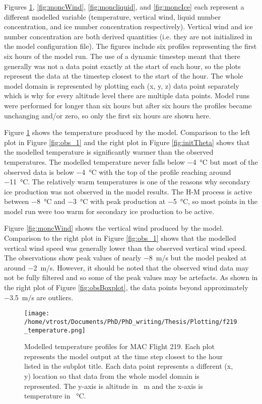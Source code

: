 Figures \ref{fig:moncTemp}, \ref{fig:moncWind}, \ref{fig:moncliquid}, and \ref{fig:moncIce} each represent a different modelled variable (temperature, vertical wind, liquid number concentration, and ice number concentration respectively). Vertical wind and ice number concentration are both derived quantities (i.e. they are not initialized in the model configuration file). The figures include six profiles representing the first six hours of the model run. The use of a dynamic timestep meant that there generally was not a data point exactly at the start of each hour, so the plots represent the data at the timestep closest to the start of the hour. The whole model domain is represented by plotting each (x, y, z) data point separately which is why for every altitude level there are multiple data points. Model runs were performed for longer than six hours but after six hours the profiles became unchanging and/or zero, so only the first six hours are shown here.

Figure \ref{fig:moncTemp} shows the temperature produced by the model. Comparison to the left plot in Figure \ref{fig:obs_1} and the right plot in Figure \ref{fig:initTheta} shows that the modelled temperature is significantly warmer than the observed temperatures. The modelled temperature never falls below \SI{-4}{\degreeCelsius} but most of the observed data is below \SI{-4}{\degreeCelsius} with the top of the profile reaching around \SI{-11}{\degreeCelsius}. The relatively warm temperatures is one of the reasons why secondary ice production was not observed in the model results. The H-M process is active between \SI{-8}{\degreeCelsius} and \SI{-3}{\degreeCelsius} with peak production at \SI{-5}{\degreeCelsius}, so most points in the model run were too warm for secondary ice production to be active.

Figure \ref{fig:moncWind} shows the vertical wind produced by the model. Comparison to the right plot in Figure \ref{fig:obs_1} shows that the modelled vertical wind speed was generally lower than the observed vertical wind speed. The observations show peak values of nearly \SI{-8}{m/s} but the model peaked at around \SI{-2}{m/s}. However, it should be noted that the observed wind data may not be fully filtered and so some of the peak values may be artefacts. As shown in the right plot of Figure \ref{fig:obsBoxplot}, the data points beyond approximately \SI{-3.5}{m/s} are outliers.

\begin{figure}[H]
	\centering
	\texttt{[image: /home/vtrost/Documents/PhD/PhD\_writing/Thesis/Plotting/f219\_temperature.png]}
	\caption{Modelled temperature profiles for MAC Flight 219. Each plot represents the model output at the time step closest to the hour listed in the subplot title. Each data point represents a different (x, y) location so that data from the whole model domain is represented. The y-axis is altitude in \SI{}{m} and the x-axis is temperature in \SI{}{\degreeCelsius}.}
	\label{fig:moncTemp}
\end{figure}

